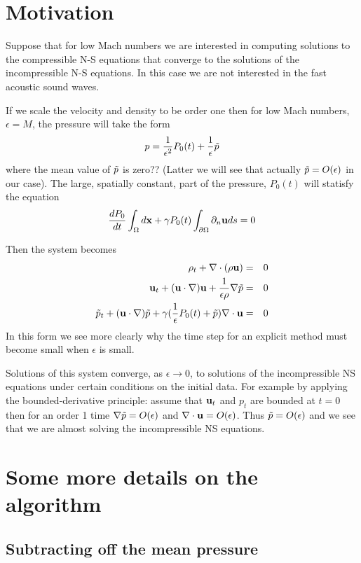 \documentclass[10pt]{article}
\begin{document}
\section{Motivation}

Suppose that for low Mach numbers we are interested in computing solutions to
the compressible N-S equations that converge to the solutions of the incompressible
N-S equations. In this case we are not interested in the fast acoustic sound waves.

If we scale the velocity and density to be order one then
for low Mach numbers, $\epsilon=M$, the pressure will take the form
\[
    p = {1\over \epsilon^2} P_0(t) + {1\over\epsilon} \tilde{p}
\]
where the mean value of $\tilde{p}$ is zero??
(Latter we will see that actually $\tilde{p}=O(\epsilon)$ in our case).
The large, spatially constant, part of the pressure, $P_0(t)$ will statisfy the equation
\[
  {d P_0 \over dt} \int_{\Omega} d{\bf x} + \gamma P_0(t) \int_{\partial \Omega} \partial_n {\bf u} ds = 0
\]

Then the system becomes
\begin{eqnarray*}
   \rho_t + \nabla\cdot(\rho {\bf u}) &=& 0 \\
   {\bf u}_t + ({\bf u}\cdot\nabla){\bf u} + {1\over\epsilon\rho}\nabla \tilde{p} &=& 0 \\
   \tilde{p}_t + ({\bf u}\cdot\nabla) \tilde{p} + \gamma ({1\over \epsilon} P_0(t) + \tilde{p}) \nabla\cdot{\bf u} &=& 0 
\end{eqnarray*}
In this form we see more clearly why the time step for an explicit method must become small when
$\epsilon$ is small.

Solutions of this system converge, as $\epsilon\rightarrow 0$, 
 to solutions of the incompressible NS equations under certain conditions on the initial data.
For example by applying the bounded-derivative principle: assume that ${\bf u}_t$ and $p_t$ are
bounded at $t=0$ then for an order 1 time
$\nabla\tilde{p}=O(\epsilon)$ and $\nabla\cdot{\bf u}=O(\epsilon)$. Thus $\tilde{p}=O(\epsilon)$ and we see
that we are almost solving the incompressible NS equations.


\section{Some more details on the algorithm}

\subsection{Subtracting off the mean pressure}
\end{document}
